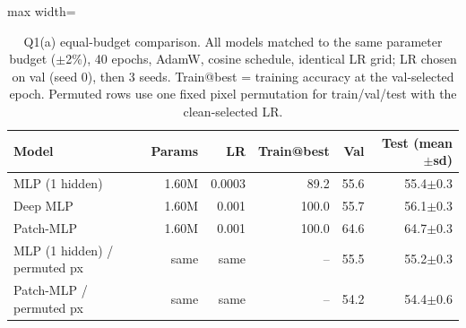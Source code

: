 \begin{table}[t]
\centering
\footnotesize
\setlength{\tabcolsep}{3.5pt}
\begin{adjustbox}{max width=\linewidth}
\begin{tabular}{lrrrrr}
\toprule
Model & Params & LR & Train@best & Val & Test (mean$\pm$sd) \\
\midrule
MLP (1 hidden) & 1.60M & 0.0003 & 89.2 & 55.6 & 55.4$\pm$0.3 \\
Deep MLP & 1.60M & 0.001 & 100.0 & 55.7 & 56.1$\pm$0.3 \\
Patch-MLP & 1.60M & 0.001 & 100.0 & 64.6 & 64.7$\pm$0.3 \\
MLP (1 hidden) / permuted px & same & same & -- & 55.5 & 55.2$\pm$0.3 \\
Patch-MLP / permuted px & same & same & -- & 54.2 & 54.4$\pm$0.6 \\
\bottomrule
\end{tabular}
\end{adjustbox}
\caption{Q1(a) equal-budget comparison. All models matched to the same parameter budget ($\pm$2\%), 40 epochs, AdamW, cosine schedule, identical LR grid; LR chosen on val (seed 0), then 3 seeds. Train@best = training accuracy at the val-selected epoch. Permuted rows use one fixed pixel permutation for train/val/test with the clean-selected LR.}
\label{tab:q1a}
\end{table}
